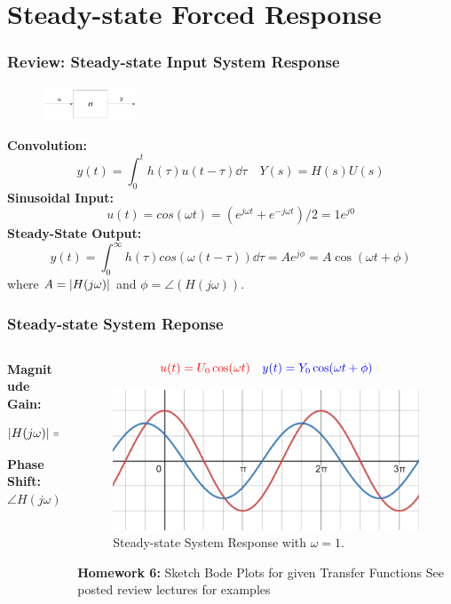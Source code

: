 \documentclass[aspectratio=169]{beamer}
\begin{document}
\section{Steady-state Forced Response}
\begin{frame}
	\frametitle{Review: Steady-state Input System Response}
	\begin{figure}
		\centering
		\includegraphics[width = 0.25\textwidth]{Images/H(s)_BlockDiagram.png}
	\end{figure}
	\textbf{Convolution:} 
	\[
		y(t) = \int_{0}^{t} h(\tau) u(t - \tau) \dd \tau 
		\quad 
		Y(s) = H(s) U(s)
	\]
	\textbf{Sinusoidal Input:} 
	\[
		u(t) = cos(\omega t) = (e^{j\omega t} + e^{-j\omega t})/2 = 1 e^{j 0}
	\]
	\textbf{Steady-State Output:} 
	\[
		y(t) = \int_{0}^{\infty} h(\tau) cos(\omega (t - \tau)) \dd \tau = A e^{j \phi} = A \cos(\omega t + \phi)
	\]
	where $A = \abs{H(j \omega)}$ and $\phi = \angle(H(j \omega))$.
\end{frame}


\begin{frame}
	\frametitle{Steady-state System Reponse}
	\begin{columns}
		\begin{column}{0.3\textwidth}
			\textbf{Magnitude Gain:} 
			\[\abs{H(j\omega)} = \frac{Y_0}{U_0} = \frac{1.5}{2} = 0.75\]
			\textbf{Phase Shift:}
			\[\angle{H(j\omega)} = \phi = \frac{\pi}{4}\]
		\end{column}
		\begin{column}{0.5\textwidth}
			\[
				\color{red}
				u(t) = U_0 \cos(\omega t)
				\quad
				\color{blue}
				y(t) = Y_0 \cos(\omega t + \phi)
			\]
			\begin{figure}
				\includegraphics[width=\textwidth]{Images/phase_shift.png}
				Steady-state System Response with $\omega = 1$.
			\end{figure}
			\footnotesize{
				\textbf{Homework 6:}
				Sketch Bode Plots for given Transfer Functions
				\tiny{See posted review lectures for examples}
			}
		\end{column}
	\end{columns}
\end{frame}
\end{document}
